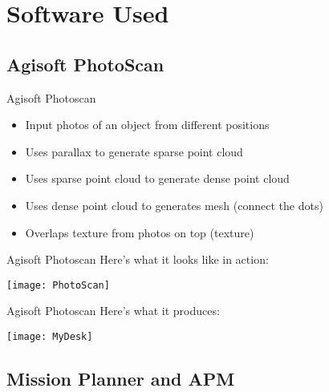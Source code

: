 \documentclass[table]{beamer}
\begin{document}
\section{Software Used}

\subsection{Agisoft PhotoScan}

\begin{frame}{Agisoft Photoscan}
    \begin{itemize}
        \item Input photos of an object from different positions
        \item Uses parallax to generate sparse point cloud
        \item Uses sparse point cloud to generate dense point cloud
        \item Uses dense point cloud to generates mesh (connect the dots)
        \item Overlaps texture from photos on top (texture)
    \end{itemize}
\end{frame}

\begin{frame}{Agisoft Photoscan}
    Here's what it looks like in action:
    \begin{center}
        \texttt{[image: PhotoScan]}
    \end{center}
\end{frame}

\begin{frame}{Agisoft Photoscan}
    Here's what it produces:
    \begin{center}
        \texttt{[image: MyDesk]}
    \end{center}
\end{frame}

\subsection{Mission Planner and APM}
\end{document}
